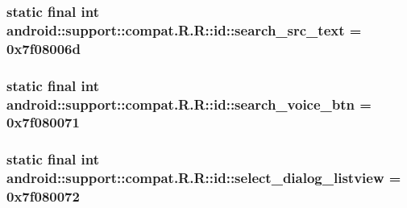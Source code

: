 \hypertarget{classandroid_1_1support_1_1compat_1_1_r_1_1id_84e79be48a1deb449f50d524d8cdafc4}{
\subsubsection[{search\_\-src\_\-text}]{\setlength{\rightskip}{0pt plus 5cm}static final int android::support::compat.R.R::id::search\_\-src\_\-text = 0x7f08006d}}
\label{classandroid_1_1support_1_1compat_1_1_r_1_1id_84e79be48a1deb449f50d524d8cdafc4}


\hypertarget{classandroid_1_1support_1_1compat_1_1_r_1_1id_e7c1c4236638562778feff1b2d0e8c38}{
\subsubsection[{search\_\-voice\_\-btn}]{\setlength{\rightskip}{0pt plus 5cm}static final int android::support::compat.R.R::id::search\_\-voice\_\-btn = 0x7f080071}}
\label{classandroid_1_1support_1_1compat_1_1_r_1_1id_e7c1c4236638562778feff1b2d0e8c38}


\hypertarget{classandroid_1_1support_1_1compat_1_1_r_1_1id_84e2d1340017df06a0d814267d380f45}{
\subsubsection[{select\_\-dialog\_\-listview}]{\setlength{\rightskip}{0pt plus 5cm}static final int android::support::compat.R.R::id::select\_\-dialog\_\-listview = 0x7f080072}}
\label{classandroid_1_1support_1_1compat_1_1_r_1_1id_84e2d1340017df06a0d814267d380f45}


